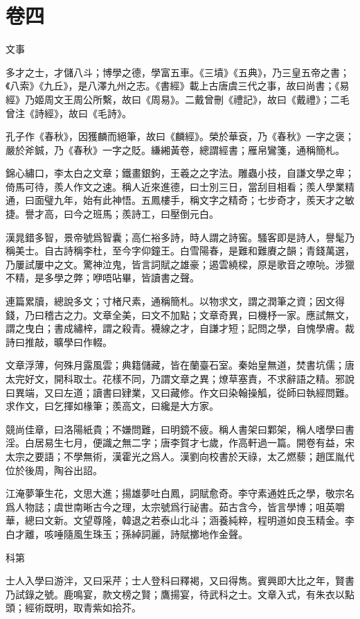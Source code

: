 \documentclass[12pt,a4paper]{ctexbook}
\begin{document}
\section{卷四}
文事\par
多才之士，才儲八斗；博學之德，學富五車。《三墳》《五典》，乃三皇五帝之書；《八索》《九丘》，是八澤九州之志。《書經》載上古唐虞三代之事，故曰尚書；《易經》乃姬周文王周公所繫，故曰《周易》。二戴曾刪《禮記》，故曰《戴禮》；二毛曾注《詩經》，故曰《毛詩》。\par
孔子作《春秋》，因獲麟而絕筆，故曰《麟經》。榮於華袞，乃《春秋》一字之褒；嚴於斧鋮，乃《春秋》一字之貶。縑緗黃卷，總謂經書；雁帛鸞箋，通稱簡札。\par
錦心繡口，李太白之文章；鐵畫銀鉤，王羲之之字法。雕蟲小技，自謙文學之卑；倚馬可待，羨人作文之速。稱人近來進德，曰士別三日，當刮目相看；羨人學業精通，曰面璧九年，始有此神悟。五鳳樓手，稱文字之精奇；七步奇才，羨天才之敏捷。譽才高，曰今之班馬；羨詩工，曰壓倒元白。\par
漢晁錯多智，景帝號爲智囊；高仁裕多詩，時人謂之詩窖。騷客即是詩人，譽髦乃稱美士。自古詩稱李杜，至今字仰鐘王。白雪陽春，是難和難賡之韻；青錢萬選，乃屢試屢中之文。驚神泣鬼，皆言詞賦之雄豪；遏雲繞樑，原是歌音之嘹喨。涉獵不精，是多學之弊；咿唔呫畢，皆讀書之聲。\par
連篇累牘，總說多文；寸楮尺素，通稱簡札。以物求文，謂之潤筆之資；因文得錢，乃曰稽古之力。文章全美，曰文不加點；文章奇異，曰機杼一家。應試無文，謂之曳白；書成繡梓，謂之殺青。襪線之才，自謙才短；記問之學，自愧學膚。裁詩曰推敲，曠學曰作輟。\par
文章浮薄，何殊月露風雲；典籍儲藏，皆在蘭臺石室。秦始皇無道，焚書坑儒；唐太完好文，開科取士。花樣不同，乃謂文章之異；燎草塞責，不求辭語之精。邪說曰異端，又曰左道；讀書曰肄業，又曰藏修。作文曰染翰操觚，從師曰執經問難。求作文，曰乞揮如椽筆；羨高文，曰纔是大方家。\par
競尚佳章，曰洛陽紙貴；不嫌問難，曰明鏡不疲。稱人書架曰鄴架，稱人嗜學曰書淫。白居易生七月，便識之無二字；唐李賀才七歲，作高軒過一篇。開卷有益，宋太宗之要語；不學無術，漢霍光之爲人。漢劉向校書於天祿，太乙燃藜；趙匡胤代位於後周，陶谷出詔。\par
江淹夢筆生花，文思大進；揚雄夢吐白鳳，詞賦愈奇。李守素通姓氏之學，敬宗名爲人物誌；虞世南晰古今之理，太宗號爲行祕書。茹古含今，皆言學博；咀英嚼華，總曰文新。文望尊隆，韓退之若泰山北斗；涵養純粹，程明道如良玉精金。李白才離，咳唾隨風生珠玉；孫綽詞麗，詩賦擲地作金聲。\par
科第\par
士人入學曰游泮，又曰采芹；士人登科曰釋褐，又曰得雋。賓興即大比之年，賢書乃試錄之號。鹿鳴宴，款文榜之賢；鷹揚宴，待武科之士。文章入式，有朱衣以點頭；經術既明，取青紫如拾芥。\par
\end{document}
